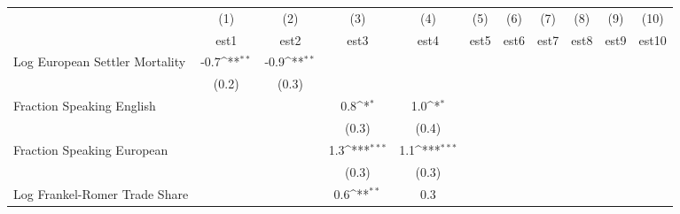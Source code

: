 {
\def\sym#1{\ifmmode^{#1}\else\(^{#1}\)\fi}
\begin{tabular}{l*{10}{c}}
                    &\multicolumn{1}{c}{(1)}         &\multicolumn{1}{c}{(2)}         &\multicolumn{1}{c}{(3)}         &\multicolumn{1}{c}{(4)}         &\multicolumn{1}{c}{(5)}         &\multicolumn{1}{c}{(6)}         &\multicolumn{1}{c}{(7)}         &\multicolumn{1}{c}{(8)}         &\multicolumn{1}{c}{(9)}         &\multicolumn{1}{c}{(10)}         \\
                    &        est1         &        est2         &        est3         &        est4         &        est5         &        est6         &        est7         &        est8         &        est9         &       est10         \\
Log European Settler Mortality&        -0.7\sym{**} &        -0.9\sym{**} &                     &                     &                     &                     &                     &                     &                     &                     \\
                    &       (0.2)         &       (0.3)         &                     &                     &                     &                     &                     &                     &                     &                     \\
Fraction Speaking English&                     &                     &         0.8\sym{*}  &         1.0\sym{*}  &                     &                     &                     &                     &                     &                     \\
                    &                     &                     &       (0.3)         &       (0.4)         &                     &                     &                     &                     &                     &                     \\
Fraction Speaking European&                     &                     &         1.3\sym{***}&         1.1\sym{***}&                     &                     &                     &                     &                     &                     \\
                    &                     &                     &       (0.3)         &       (0.3)         &                     &                     &                     &                     &                     &                     \\
Log Frankel-Romer Trade Share&                     &                     &         0.6\sym{**} &         0.3         &                     &                     &                     &                     &                     &                     \\

\end{tabular}}
